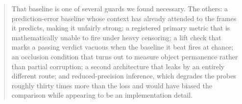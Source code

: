 \documentclass[11pt]{article}
\begin{document}
\begin{abstract}
That baseline is one of several guards we found necessary. The others: a
prediction-error baseline whose context has already attended to the frames it
predicts, making it unfairly strong; a registered primary metric that is
mathematically unable to fire under heavy censoring; a lift check that marks a
passing verdict vacuous when the baseline it beat fires at chance; an occlusion
condition that turns out to measure object permanence rather than partial
corruption; a second architecture that leaks by an entirely different route;
and reduced-precision inference, which degrades the probes roughly thirty times
more than the loss and would have biased the comparison while appearing to be
an implementation detail.
\end{abstract}














\appendix

\end{document}
